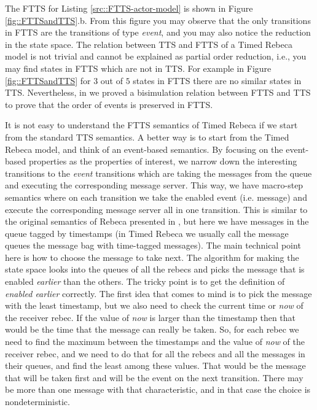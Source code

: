 The FTTS for Listing \ref{src::FTTS-actor-model} is shown in Figure \ref{fig::FTTSandTTS}.b. From this figure you may observe that the only transitions in FTTS are the transitions of type \textit{event}, and you may also notice the reduction in the state space.
%
The relation between TTS and FTTS of a Timed Rebeca model is not trivial and cannot be explained as partial order reduction, i.e., you may find states in FTTS which are not in TTS.
For example in Figure \ref{fig::FTTSandTTS} for $3$ out of $5$ states in FTTS there are no similar states in TTS. Nevertheless, in \cite{DBLP:conf/facs2/KhamespanahSVK15} we proved a bisimulation relation between FTTS and TTS to prove that the order of events is preserved in FTTS.

 It is not easy to understand the FTTS semantics of Timed Rebeca if we start from the standard TTS semantics. A better way is to start from the Timed Rebeca model, and think of an event-based semantics. By focusing on the event-based properties as the properties of interest, we narrow down the interesting transitions to the \textit{event} transitions which are taking the messages from the queue and executing the corresponding message server.
This way, we have macro-step semantics where on each transition we take the enabled event (i.e. message) and execute the corresponding message server all in one transition. This is similar to the original semantics of Rebeca presented in \cite{DBLP:journals/fuin/SirjaniMSB04}, but here we have messages in the queue tagged by timestamps (in Timed Rebeca we usually call the message queues the message bag with time-tagged messages). The main technical point here is how to choose the message to take next. The algorithm for making the state space looks into the queues of all the rebecs and picks the message that is enabled \textit{earlier} than the others.  The tricky point is to get the definition of \textit{enabled earlier} correctly. The first idea that comes to mind is to pick the message with the least timestamp, but we also need to check the current time or \textit{now} of the receiver rebec. If the value of \textit{now} is larger than the timestamp then that would be the time that the message can really be taken. So,  for each rebec we need to find the maximum between  the timestamps and the value of  \textit{now} of the receiver rebec, and we need to do that for all the rebecs and all the messages in their queues,  and find the least among these values. That would be the message that will be taken first and will be the event on the next transition. There may be more than one message with that characteristic, and in that case the choice is nondeterministic.



